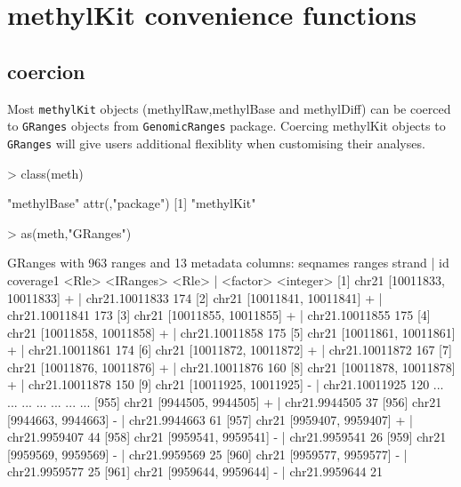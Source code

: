 \documentclass{article}
\begin{document}
\section{methylKit convenience functions}
\subsection{coercion}
Most \texttt{methylKit} objects (methylRaw,methylBase and methylDiff) can be coerced to \texttt{GRanges} objects from \texttt{GenomicRanges} package. Coercing methylKit objects to \texttt{GRanges} will give users additional flexiblity when customising their analyses.

\begin{Schunk}
\begin{Sinput}
> class(meth)
\end{Sinput}
\begin{Soutput}
[1] "methylBase"
attr(,"package")
[1] "methylKit"
\end{Soutput}
\begin{Sinput}
> as(meth,"GRanges")
\end{Sinput}
\begin{Soutput}
GRanges with 963 ranges and 13 metadata columns:
        seqnames               ranges strand   |             id coverage1
           <Rle>            <IRanges>  <Rle>   |       <factor> <integer>
    [1]    chr21 [10011833, 10011833]      +   | chr21.10011833       174
    [2]    chr21 [10011841, 10011841]      +   | chr21.10011841       173
    [3]    chr21 [10011855, 10011855]      +   | chr21.10011855       175
    [4]    chr21 [10011858, 10011858]      +   | chr21.10011858       175
    [5]    chr21 [10011861, 10011861]      +   | chr21.10011861       174
    [6]    chr21 [10011872, 10011872]      +   | chr21.10011872       167
    [7]    chr21 [10011876, 10011876]      +   | chr21.10011876       160
    [8]    chr21 [10011878, 10011878]      +   | chr21.10011878       150
    [9]    chr21 [10011925, 10011925]      -   | chr21.10011925       120
    ...      ...                  ...    ... ...            ...       ...
  [955]    chr21   [9944505, 9944505]      +   |  chr21.9944505        37
  [956]    chr21   [9944663, 9944663]      -   |  chr21.9944663        61
  [957]    chr21   [9959407, 9959407]      +   |  chr21.9959407        44
  [958]    chr21   [9959541, 9959541]      -   |  chr21.9959541        26
  [959]    chr21   [9959569, 9959569]      -   |  chr21.9959569        25
  [960]    chr21   [9959577, 9959577]      -   |  chr21.9959577        25
  [961]    chr21   [9959644, 9959644]      -   |  chr21.9959644        21

\end{Soutput}
\end{Schunk}
\end{document}
